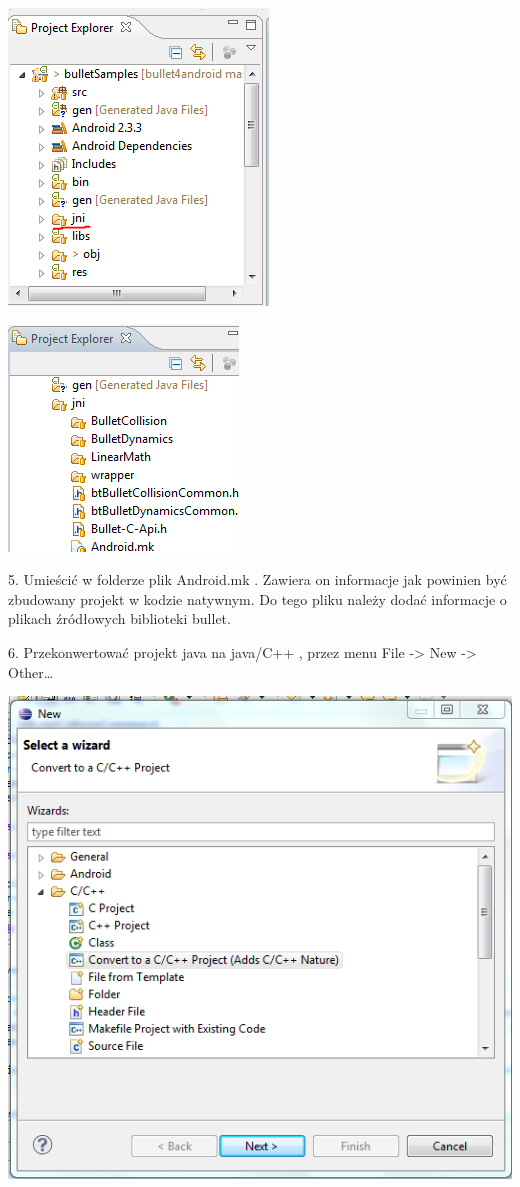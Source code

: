 \documentclass[12pt]{article}
\begin{document}
  \includegraphics{./img/jni-folder.png}
  
  \includegraphics{./img/bulletFoldery.png}
  
  5. Umieścić w folderze plik Android.mk . Zawiera on informacje jak powinien
  być zbudowany projekt w kodzie natywnym. Do tego pliku należy
  dodać informacje o plikach źródłowych biblioteki bullet.
  
  
  6. Przekonwertować projekt java na java/C++ , przez menu File -> New ->
  Other\ldots
  
  \includegraphics{./img/convert.png}
  
\end{document}
